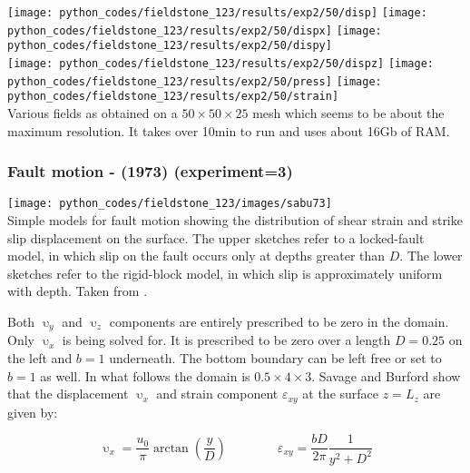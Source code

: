\begin{center}
\texttt{[image: python\_codes/fieldstone\_123/results/exp2/50/disp]} 
\texttt{[image: python\_codes/fieldstone\_123/results/exp2/50/dispx]} 
\texttt{[image: python\_codes/fieldstone\_123/results/exp2/50/dispy]} \\
\texttt{[image: python\_codes/fieldstone\_123/results/exp2/50/dispz]} 
\texttt{[image: python\_codes/fieldstone\_123/results/exp2/50/press]} 
\texttt{[image: python\_codes/fieldstone\_123/results/exp2/50/strain]}\\ 
{\captionfont Various fields as obtained on a $50\times 50 \times25$ mesh
which seems to be about the maximum resolution. It takes over 10min to run and uses about 16Gb of RAM.}
\end{center}

\subsubsection*{Fault motion - \textcite{sabu73} (1973) (experiment=3)}


\begin{center}
\texttt{[image: python\_codes/fieldstone\_123/images/sabu73]}\\
{\captionfont  Simple models for fault motion showing the distribution of shear 
strain and strike slip displacement on the surface. The upper sketches refer to 
a locked-fault model, in which slip on the fault occurs only at depths greater than $D$. 
The lower sketches refer to the rigid-block model, in which slip is approximately uniform with depth.
Taken from \textcite{sabu73}.}
\end{center}

Both $\upupsilon_y$ and $\upupsilon_z$ 
components are entirely prescribed to be zero in the domain. 
Only $\upupsilon_x$ is being solved for. It is prescribed to be zero 
over a length $D=0.25$ on the left and $b=1$ underneath. 
The bottom boundary can be left free or set to $b=1$ as well.
In what follows the domain is $0.5\times 4\times 3$.
Savage and Burford \cite{sabu73} show that the displacement $\upupsilon_x$ 
and strain component ${\varepsilon}_{xy}$ at the surface $z=L_z$ are given by:

\[
\upupsilon_x=\frac{u_0}{\pi} \arctan\left(\frac{y}{D}\right)
\quad\quad
\quad\quad
{\varepsilon}_{xy} = \frac{bD}{2\pi}  \frac{1}{y^2+D^2}
\]

